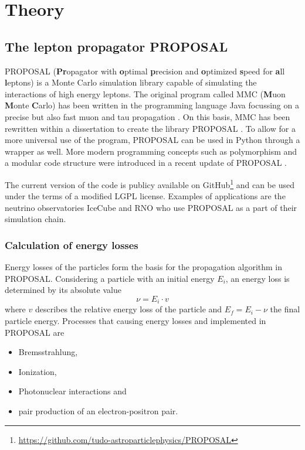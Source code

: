 \chapter{Theory}

\section{The lepton propagator PROPOSAL}

PROPOSAL (\textbf{Pr}opagator with \textbf{o}ptimal \textbf{p}recision and \textbf{o}ptimized \textbf{s}peed for \textbf{a}ll \textbf{l}eptons) is a Monte Carlo simulation library capable of simulating the interactions of high energy leptons.
The original program called MMC (\textbf{M}uon \textbf{M}onte \textbf{C}arlo) has been written in the programming language Java focussing on a precise but also fast muon and tau propagation \cite{chirkin2004propagating}.
On this basis, MMC has been rewritten within a dissertation to create the \CC library PROPOSAL \cite{Kohne:2013zbq}.
To allow for a more universal use of the program, PROPOSAL can be used in Python through a wrapper as well.
More modern programming concepts such as polymorphism and a modular code structure were introduced in a recent update of PROPOSAL \cite{dunsch_2018_proposal_improvements}.

The current version of the code is publicy available on GitHub\footnote{\url{https://github.com/tudo-astroparticlephysics/PROPOSAL}} and can be used under the terms of a modified LGPL license.
Examples of applications are the neutrino observatories IceCube and RNO who use PROPOSAL as a part of their simulation chain.

\subsection{Calculation of energy losses}

Energy losses of the particles form the basis for the propagation algorithm in PROPOSAL.
Considering a particle with an initial energy $E_i$, an energy loss is determined by its absolute value
\begin{equation}
	\nu = E_i \cdot v
\end{equation}
where $v$ describes the relative energy loss of the particle and $E_f = E_i - \nu$ the final particle energy.
Processes that causing energy losses and implemented in PROPOSAL are
\begin{itemize}
	\item Bremsstrahlung,
	\item Ionization,
	\item Photonuclear interactions and
	\item pair production of an electron-positron pair.
\end{itemize}

